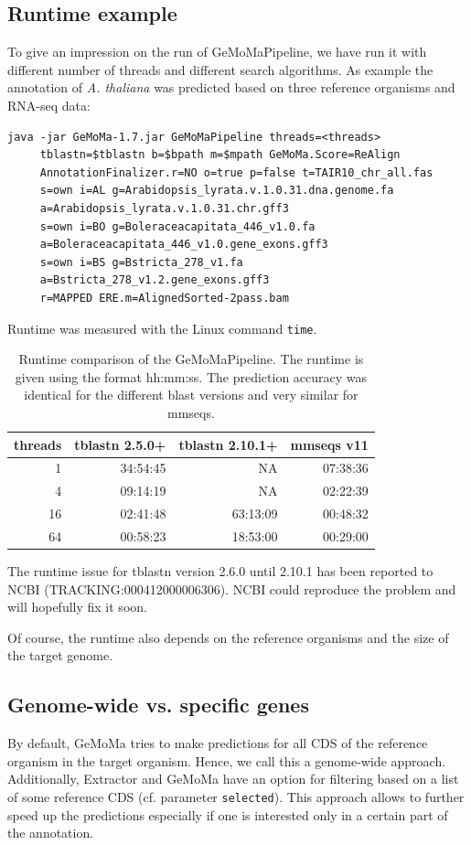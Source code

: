 \documentclass{article}
\begin{document}
\subsection{Runtime example}
To give an impression on the run of GeMoMaPipeline, we have run it with different number of threads and different search algorithms.
As example the annotation of \emph{A. thaliana} was predicted based on three reference organisms and RNA-seq data:
\begin{verbatim}
java -jar GeMoMa-1.7.jar GeMoMaPipeline threads=<threads> 
     tblastn=$tblastn b=$bpath m=$mpath GeMoMa.Score=ReAlign
     AnnotationFinalizer.r=NO o=true p=false t=TAIR10_chr_all.fas 
     s=own i=AL g=Arabidopsis_lyrata.v.1.0.31.dna.genome.fa
     a=Arabidopsis_lyrata.v.1.0.31.chr.gff3 
     s=own i=BO g=Boleraceacapitata_446_v1.0.fa
     a=Boleraceacapitata_446_v1.0.gene_exons.gff3
     s=own i=BS g=Bstricta_278_v1.fa
     a=Bstricta_278_v1.2.gene_exons.gff3
     r=MAPPED ERE.m=AlignedSorted-2pass.bam
\end{verbatim}
Runtime was measured with the Linux command \verb+time+.
\begin{table}[ht]\centering
\begin{tabular}{|r||r|r|r|}
\hline
threads	&tblastn 2.5.0+	&tblastn 2.10.1+	&mmseqs v11%
\\
\hline\hline
1	&34:54:45	&NA	&07:38:36\\\hline
4	&09:14:19	&NA	&02:22:39\\\hline
16	&02:41:48	&63:13:09	&00:48:32\\\hline
64	&00:58:23	&18:53:00	&00:29:00\\\hline
\end{tabular}
\caption{
Runtime comparison of the GeMoMaPipeline. The runtime is given using the format hh:mm:ss.
The prediction accuracy was identical for the different blast versions and very similar for mmseqs.
}
\end{table}
The runtime issue for tblastn version 2.6.0 until 2.10.1 has been reported to NCBI (TRACKING:000412000006306). NCBI could reproduce the problem and will hopefully fix it soon.

Of course, the runtime also depends on the reference organisms and the size of the target genome.


\subsection{Genome-wide vs. specific genes}
By default, GeMoMa tries to make predictions for all CDS of the reference organism in the target organism. Hence, we call this a genome-wide approach. Additionally, Extractor and GeMoMa have an option for filtering based on a list of some reference CDS (cf. parameter \texttt{selected}). This approach allows to further speed up the predictions especially if one is interested only in a certain part of the annotation.
\end{document}

